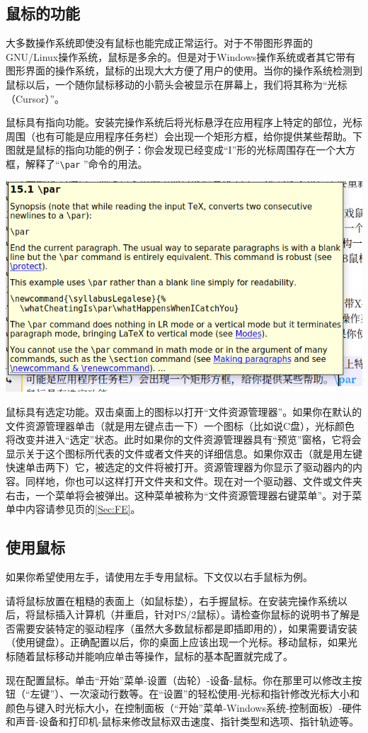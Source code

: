 \subsection{鼠标的功能}
大多数操作系统即使没有鼠标也能完成正常运行。对于不带图形界面的GNU/Linux操作系统，鼠标是多余的。但是对于Windows操作系统或者其它带有图形界面的操作系统，鼠标的出现大大方便了用户的使用。当你的操作系统检测到鼠标以后，一个随你鼠标移动的小箭头会被显示在屏幕上，我们将其称为“光标（Cursor）”。\par
鼠标具有指向功能。安装完操作系统后将光标悬浮在应用程序上特定的部位，光标周围（也有可能是应用程序任务栏）会出现一个矩形方框，给你提供某些帮助。下图就是鼠标的指向功能的例子：你会发现已经变成“I”形的光标周围存在一个大方框，解释了“\verb|\par| ”命令的用法。
\begin{center}
	\includegraphics{pic/Crusor}
\end{center}\par
鼠标具有选定功能。双击桌面上的图标以打开“文件资源管理器”。如果你在默认的文件资源管理器单击（就是用左键点击一下）一个图标（比如说C盘），光标颜色将改变并进入“选定”状态。此时如果你的文件资源管理器具有“预览”窗格，它将会显示关于这个图标所代表的文件或者文件夹的详细信息。如果你双击（就是用左键快速单击两下）它，被选定的文件将被打开。资源管理器为你显示了驱动器内的内容。同样地，你也可以这样打开文件夹和文件。现在对一个驱动器、文件或文件夹右击，一个菜单将会被弹出。这种菜单被称为“文件资源管理器右键菜单”。对于菜单中内容请参见\pageref{Sec:FE}页的\ref{Sec:FE}。
\subsection{使用鼠标}
如果你希望使用左手，请使用左手专用鼠标。下文仅以右手鼠标为例。\par
请将鼠标放置在粗糙的表面上（如鼠标垫），右手握鼠标。在安装完操作系统以后，将鼠标插入计算机（并重启，针对PS/2鼠标）。请检查你鼠标的说明书了解是否需要安装特定的驱动程序（虽然大多数鼠标都是即插即用的），如果需要请安装（使用键盘）。正确配置以后，你的桌面上应该出现一个光标。移动鼠标，如果光标随着鼠标移动并能响应单击等操作，鼠标的基本配置就完成了。\par
现在配置鼠标。单击“开始”菜单-设置（齿轮）-设备-鼠标。你在那里可以修改主按钮（“左键”）、一次滚动行数等。在“设置”的轻松使用-光标和指针修改光标大小和颜色与键入时光标大小，在控制面板（“开始”菜单-Windows系统-控制面板）-硬件和声音-设备和打印机-鼠标来修改鼠标双击速度、指针类型和选项、指针轨迹等。
